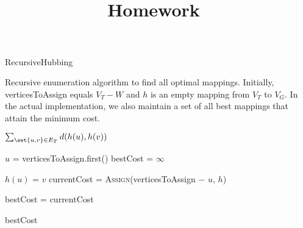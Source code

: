 \documentclass[language=english, number=1]{../lib/homework}
\title{\textbf{\hw@coursename}\\Homework~\hw@number}%
\begin{document}

    \begin{algorithm}
        \caption{RecursiveHubbing}
        \label{alg:TriangulateStar}
        \begin{algorithmic}[1]
            \Statex Recursive enumeration algorithm to find all optimal mappings. Initially, verticesToAssign equals $V_T - W$ and $h$ is an empty mapping from $V_T$ to $V_G$. In the actual implementation, we also maintain a set of all best mappings that attain the minimum cost.

                    \State \Return $\sum_{\set{u, v} \in E_T} d(h(u), h(v))$ 
                \EndIf

                \State $u$ = verticesToAssign.first()
                \State bestCost = $\infty$

                    \State $h(u)$ = $v$
                    \State currentCost = \textsc{Assign}(verticesToAssign $-$ $u$, $h$)

                        \State bestCost = currentCost
                    \EndIf
                \EndFor

                \State \Return bestCost
            \EndProcedure
        \end{algorithmic}
    \end{algorithm}
\end{document}
